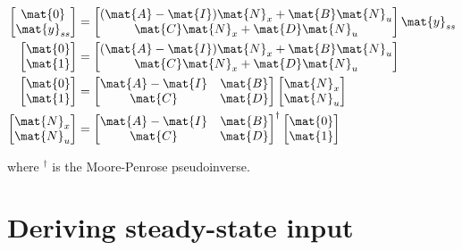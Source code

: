 \begin{align*}
  \begin{bmatrix}
    \mat{0} \\
    \mat{y}_{ss}
  \end{bmatrix} &=
  \begin{bmatrix}
    (\mat{A} - \mat{I})\mat{N}_x + \mat{B}\mat{N}_u \\
    \mat{C}\mat{N}_x + \mat{D}\mat{N}_u
  \end{bmatrix}
  \mat{y}_{ss} \\
  \begin{bmatrix}
    \mat{0} \\
    \mat{1}
  \end{bmatrix} &=
  \begin{bmatrix}
    (\mat{A} - \mat{I})\mat{N}_x + \mat{B}\mat{N}_u \\
    \mat{C}\mat{N}_x + \mat{D}\mat{N}_u
  \end{bmatrix} \\
  \begin{bmatrix}
    \mat{0} \\
    \mat{1}
  \end{bmatrix} &=
  \begin{bmatrix}
    \mat{A} - \mat{I} & \mat{B} \\
    \mat{C} & \mat{D}
  \end{bmatrix}
  \begin{bmatrix}
    \mat{N}_x \\
    \mat{N}_u
  \end{bmatrix} \\
  \begin{bmatrix}
    \mat{N}_x \\
    \mat{N}_u
  \end{bmatrix} &=
  \begin{bmatrix}
    \mat{A} - \mat{I} & \mat{B} \\
    \mat{C} & \mat{D}
  \end{bmatrix}^{\dagger}
  \begin{bmatrix}
    \mat{0} \\
    \mat{1}
  \end{bmatrix}
\end{align*}

where $^\dagger$ is the Moore-Penrose pseudoinverse.

\section{Deriving steady-state input}

